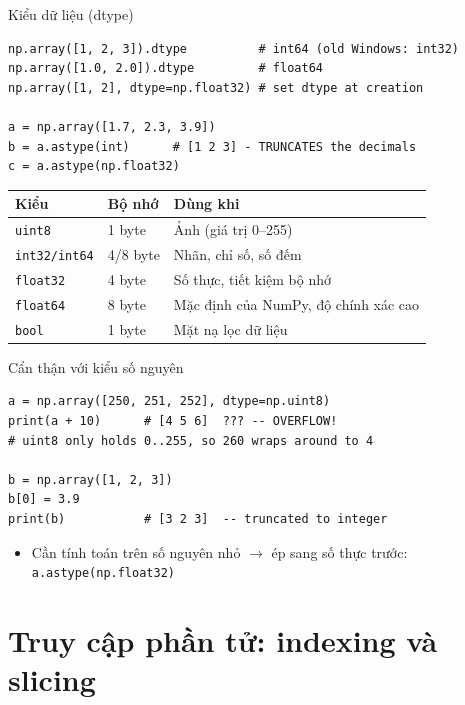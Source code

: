 \documentclass[11pt]{beamer}
\begin{document}
\begin{frame}[fragile]{Kiểu dữ liệu (dtype)}
\begin{lstlisting}
np.array([1, 2, 3]).dtype          # int64 (old Windows: int32)
np.array([1.0, 2.0]).dtype         # float64
np.array([1, 2], dtype=np.float32) # set dtype at creation

a = np.array([1.7, 2.3, 3.9])
b = a.astype(int)      # [1 2 3] - TRUNCATES the decimals
c = a.astype(np.float32)
\end{lstlisting}
\begin{center}
\small
\begin{tabular}{|l|l|l|}
\hline
\textbf{Kiểu} & \textbf{Bộ nhớ} & \textbf{Dùng khi} \\
\hline
\texttt{uint8}   & 1 byte & Ảnh (giá trị 0--255) \\
\texttt{int32/int64} & 4/8 byte & Nhãn, chỉ số, số đếm \\
\texttt{float32} & 4 byte & Số thực, tiết kiệm bộ nhớ \\
\texttt{float64} & 8 byte & Mặc định của NumPy, độ chính xác cao \\
\texttt{bool}    & 1 byte & Mặt nạ lọc dữ liệu \\
\hline
\end{tabular}
\end{center}
\end{frame}

\begin{frame}[fragile]{Cẩn thận với kiểu số nguyên}
\begin{lstlisting}
a = np.array([250, 251, 252], dtype=np.uint8)
print(a + 10)      # [4 5 6]  ??? -- OVERFLOW!
# uint8 only holds 0..255, so 260 wraps around to 4

b = np.array([1, 2, 3])
b[0] = 3.9
print(b)           # [3 2 3]  -- truncated to integer
\end{lstlisting}
\begin{itemize}
  \item Cần tính toán trên số nguyên nhỏ $\to$ ép sang số thực trước: \texttt{a.astype(np.float32)}
\end{itemize}
\end{frame}

\section{Truy cập phần tử: indexing và slicing}
\end{document}
